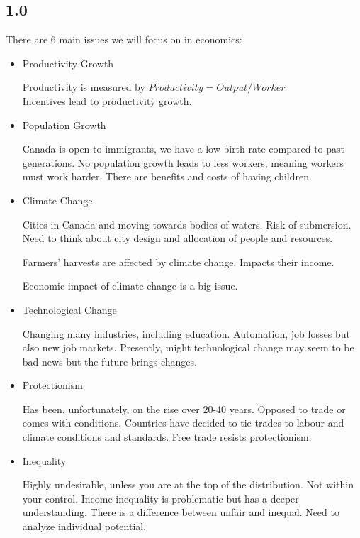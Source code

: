 
\subsection*{1.0}

There are 6 main issues we will focus on in economics:
\begin{itemize}
    \item \begin{definition}Productivity Growth\end{definition}
    Productivity is measured by ${Productivity=Output/Worker}$\\
    Incentives lead to productivity growth.
    \item \begin{definition} Population Growth\end{definition}
    Canada is open to immigrants, we have a low birth rate compared to past generations.
    No population growth leads to less workers, meaning workers must work harder.
    There are benefits and costs of having children.
    \item \begin{definition}Climate Change\end{definition}
    Cities in Canada and moving towards bodies of waters. Risk of submersion.
    Need to think about city design and allocation of people and resources.
    \begin{example}
        Farmers' harvests are affected by climate change. Impacts their income.
    \end{example}
    Economic impact of climate change is a big issue.
    \item \begin{definition}Technological Change\end{definition}
    Changing many industries, including education.
    Automation, job losses but also new job markets.
    Presently, might technological change may seem to be bad news but the future brings changes.
    \item \begin{definition}Protectionism\end{definition}
    Has been, unfortunately, on the rise over 20-40 years.
    Opposed to trade or comes with conditions.
    Countries have decided to tie trades to labour and climate conditions and standards.
    Free trade resists protectionism.
    \item \begin{definition}Inequality\end{definition}
    Highly undesirable, unless you are at the top of the distribution.
    Not within your control.
    Income inequality is problematic but has a deeper understanding. There is a difference between unfair and inequal.
    Need to analyze individual potential.
\end{itemize}